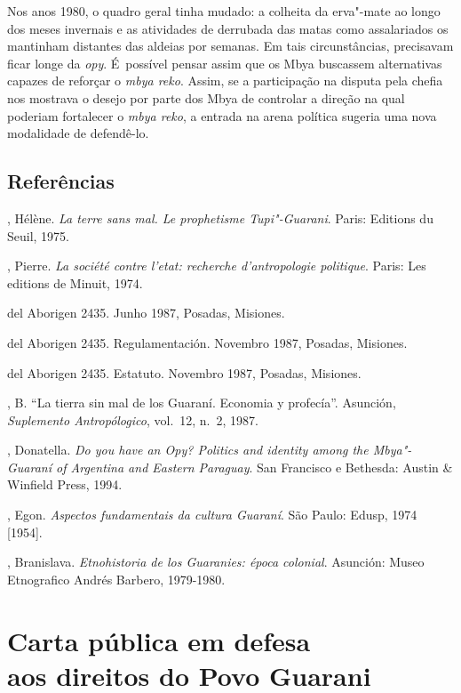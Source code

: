 Nos anos 1980, o quadro geral tinha mudado: a colheita da erva"-mate ao
longo dos meses invernais e as atividades de derrubada das matas como
assalariados os mantinham distantes das aldeias por semanas. Em tais
circunstâncias, precisavam ficar longe da \emph{opy}. É~possível pensar assim
que os Mbya buscassem alternativas capazes de reforçar o \emph{mbya reko}.
Assim, se a participação na disputa pela chefia nos mostrava o desejo
por parte dos Mbya de controlar a direção na qual poderiam fortalecer o
\emph{mbya reko}, a entrada na arena política sugeria uma nova modalidade de
defendê-lo. 

\section{Referências}

\begin{Parskip}
, Hélène. \emph{La terre sans mal. Le prophetisme Tupi"-Guarani}. Paris:
Editions du Seuil, 1975.

, Pierre. \emph{La société contre l’etat: recherche d’antropologie
politique}. Paris: Les editions de Minuit, 1974.

 del Aborigen 2435. Junho 1987, Posadas, Misiones.

 del Aborigen 2435. Regulamentación. Novembro 1987, Posadas,
Misiones.

 del Aborigen 2435. Estatuto. Novembro 1987, Posadas, Misiones.

, B. ``La tierra sin mal de los Guaraní. Economia y profecía''.
Asunción, \emph{Suplemento Antropólogico}, vol.~12, n.~2, 1987.

, Donatella. \emph{Do you have an \emph{Opy}? Politics and identity among the
Mbya"-Guaraní of Argentina and Eastern Paraguay}. San Francisco e
Bethesda: Austin \& Winfield Press, 1994.

, Egon. \emph{Aspectos fundamentais da cultura Guaraní}. São Paulo:
Edusp, 1974 [1954].

, Branislava. \emph{Etnohistoria de los Guaranies: época colonial}.
Asunción: Museo Etnografico Andrés Barbero, 1979-1980.
\end{Parskip}

\chapter*{Carta pública em defesa\\ aos direitos do Povo Guarani}


